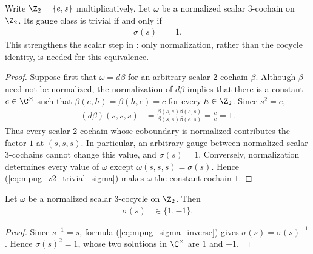 \begin{lemma}
    \label{thm:mpug_z2_trivial_scalar_class}
    \leanok
    Write $\Z_2=\{e,s\}$ multiplicatively. Let $\omega$ be a normalized
    scalar $3$-cochain on $\Z_2$. Its gauge
    class is trivial if and only if
    \begin{align}
        \sigma(s) & =1.
        \label{eq:mpug_z2_trivial_sigma}
    \end{align}
    This strengthens the scalar step in
    \cite[lines~5339--5341]{FrancoRubio2025MPUGauging}: only normalization,
    rather than the cocycle identity, is needed for this equivalence.
\end{lemma}
\begin{proof}\leanok
    Suppose first that $\omega=d\beta$ for an arbitrary scalar $2$-cochain
    $\beta$. Although $\beta$ need not be normalized, the normalization of
    $d\beta$ implies that there is a constant $c\in\C^\times$ such that
    $\beta(e,h)=\beta(h,e)=c$ for every $h\in\Z_2$. Since $s^2=e$,
    \begin{align}
        (d\beta)(s,s,s)
         & =\frac{\beta(s,e)\beta(s,s)}
            {\beta(s,s)\beta(e,s)}=\frac{c}{c}=1.
        \label{eq:mpug_z2_coboundary_generator}
    \end{align}
    Thus every scalar $2$-cochain whose coboundary is normalized contributes
    the factor $1$ at $(s,s,s)$. In particular, an arbitrary gauge between
    normalized scalar $3$-cochains cannot change this value, and
    $\sigma(s)=1$. Conversely, normalization determines every
    value of $\omega$ except $\omega(s,s,s)=\sigma(s)$. Hence
    (\ref{eq:mpug_z2_trivial_sigma}) makes $\omega$ the constant cochain $1$.
\end{proof}

\begin{lemma}
    \label{thm:mpug_z2_sigma_sign}
    \leanok
    Let $\omega$ be a normalized scalar $3$-cocycle on $\Z_2$. Then
    \begin{align}
        \sigma(s) & \in\{1,-1\}.
        \label{eq:mpug_z2_sigma_sign}
    \end{align}
\end{lemma}
\begin{proof}\leanok
    Since $s^{-1}=s$, formula (\ref{eq:mpug_sigma_inverse}) gives
    $\sigma(s)=\sigma(s)^{-1}$. Hence $\sigma(s)^2=1$, whose two solutions in
    $\C^\times$ are $1$ and $-1$.
\end{proof}

